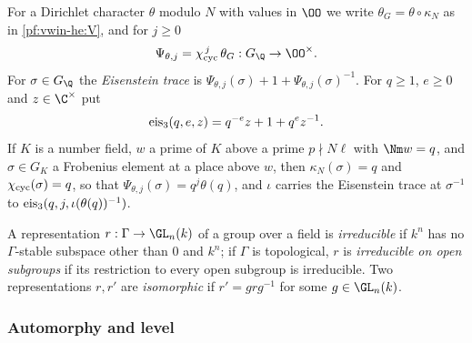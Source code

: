 For a Dirichlet character $\theta$ modulo $N$ with values in $\OO$ we write $\theta_G=\theta\circ\kappa_N$ as in
\cref{pf:vwin-he:V}, and for $j\ge0$
\begin{equation}\label{pf:eis:Psi}
\Psi_{\theta,j}=\eiscyc^{\,j}\,\theta_G:G_\Q\to\OO^\times .
\end{equation}
For $\sigma\in G_\Q$ the \emph{Eisenstein trace} is $\Psi_{\theta,j}(\sigma)+1+\Psi_{\theta,j}(\sigma)^{-1}$. For
$q\ge1$, $e\ge0$ and $z\in\C^\times$ put
\begin{equation}\label{pf:eis:eis3}
\mathrm{eis}_3(q,e,z)=q^{-e}z+1+q^{e}z^{-1}.
\end{equation}
If $K$ is a number field, $w$ a prime of $K$ above a prime $p\nmid N\ell$ with $\Nm w=q$, and $\sigma\in G_K$ a
Frobenius element at a place above $w$, then $\kappa_N(\sigma)=q$ and $\chi_{\mathrm{cyc}}(\sigma)=q$, so that
$\Psi_{\theta,j}(\sigma)=q^j\theta(q)$, and $\iota$ carries the Eisenstein trace at $\sigma^{-1}$ to
$\mathrm{eis}_3(q,j,\iota(\theta(q))^{-1})$.

A representation $r:\Gamma\to\GL_n(k)$ of a group over a field is \emph{irreducible} if $k^n$ has no
$\Gamma$-stable subspace other than $0$ and $k^n$; if $\Gamma$ is topological, $r$ is \emph{irreducible on open
subgroups} if its restriction to every open subgroup is irreducible. Two representations $r,r'$ are
\emph{isomorphic} if $r'=grg^{-1}$ for some $g\in\GL_n(k)$.

\subsubsection{Automorphy and level}


